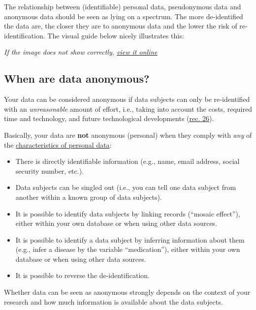 \documentclass[
]{book}
\providecommand{\tightlist}{%
  \setlength{\itemsep}{0pt}\setlength{\parskip}{0pt}}
\begin{document}
The relationship between (identifiable) personal data, pseudonymous data and
anonymous data should be seen as lying on a spectrum. The more de-identified the
data are, the closer they are to anonymous data and the lower the risk of
re-identification. The visual guide below nicely illustrates this:



\emph{If the image does not show correctly,
\href{https://fpf.org/wp-content/uploads/2017/06/FPF_Visual-Guide-to-Practical-Data-DeID.pdf}{view it online}}

\hypertarget{when-anonymous}{%
\subsection{When are data anonymous?}\label{when-anonymous}}

Your data can be considered anonymous if data subjects can only be re-identified
with an \emph{unreasonable} amount of effort, i.e., taking into account the costs,
required time and technology, and future technological developments
(\href{https://gdpr-info.eu/recitals/no-26/}{rec. 26}).

Basically, your data are \textbf{not} anonymous (personal) when they comply with
\emph{any} of the \protect\hyperlink{personal-data-assess}{characteristics of personal data}:

\begin{itemize}
\tightlist
\item
  There is directly identifiable information (e.g., name, email address, social
  security number, etc.).
\item
  Data subjects can be singled out (i.e., you can tell one data subject from
  another within a known group of data subjects).
\item
  It is possible to identify data subjects by linking records (``mosaic effect''),
  either within your own database or when using other data sources.
\item
  It is possible to identify a data subject by inferring information about them
  (e.g., infer a disease by the variable ``medication''), either within
  your own database or when using other data sources.
\item
  It is possible to reverse the de-identification.
\end{itemize}

Whether data can be seen as anonymous strongly depends on the context of your
research and how much information is available about the data subjects.
\end{document}

